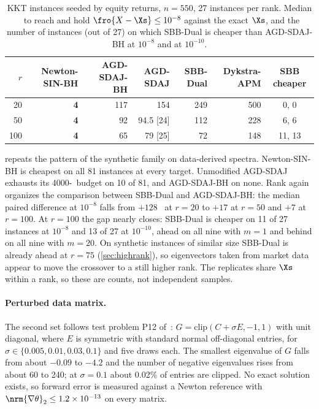 \begin{table}[t]
\centering
\caption{KKT instances seeded by equity returns, $n=550$, 27 instances per
rank. Median \EVDs\ to reach and hold $\fro{X-\Xs}\le10^{-8}$ against the exact
$\Xs$, and the number of instances (out of 27) on which SBB-Dual is cheaper
than AGD-SDAJ-BH at $10^{-8}$ and at $10^{-10}$.}
\label{tab:thesiskkt}
\small
\begin{tabular}{rrrrrrc}
\toprule
$r$ & Newton-SIN-BH & AGD-SDAJ-BH & AGD-SDAJ & SBB-Dual & Dykstra-APM & SBB cheaper\\
\midrule
20  & \textbf{4} & 117 & 154 & 249 & 500 & 0, 0\\
50  & \textbf{4} & 92  & 94.5 \tiny[24] & 112 & 228 & 6, 6\\
100 & \textbf{4} & 65  & 79 \tiny[25] & 72  & 148 & 11, 13\\
\bottomrule
\end{tabular}
\end{table}

 repeats the pattern of the synthetic family on
data-derived spectra. Newton-SIN-BH is cheapest on all 81 instances at every
target. Unmodified AGD-SDAJ exhausts its 4000-\EVD\ budget on 10 of 81, and
AGD-SDAJ-BH on none. Rank again organizes the comparison between SBB-Dual and
AGD-SDAJ-BH: the median paired difference at $10^{-8}$ falls from $+128$ \EVDs\
at $r=20$ to $+17$ at $r=50$ and $+7$ at $r=100$. At $r=100$ the gap nearly
closes: SBB-Dual is cheaper on 11 of 27 instances at $10^{-8}$ and 13 of 27 at
$10^{-10}$, ahead on all nine with $m=1$ and behind on all nine with $m=20$.
On synthetic instances of similar size SBB-Dual is already ahead at $r=75$
(\cref{sec:highrank}), so eigenvectors taken from market data appear to move
the crossover to a still higher rank. The replicates share $\Xs$ within a
rank, so these are counts, not independent samples.

\paragraph{Perturbed data matrix.}
The second set follows test problem P12 of~\cite{huynh2025accelerated}:
$G=\mathrm{clip}(C+\sigma E,-1,1)$ with unit diagonal, where $E$ is symmetric
with standard normal off-diagonal entries, for
$\sigma\in\{0.005,0.01,0.03,0.1\}$ and five draws each. The smallest
eigenvalue of $G$ falls from about $-0.09$ to $-4.2$ and the number of negative
eigenvalues rises from about 60 to 240; at $\sigma=0.1$ about 0.02\% of entries
are clipped. No exact solution exists, so forward error is measured against a
Newton reference with $\nrm{\nabla\theta}_2\le1.2\times10^{-13}$ on every
matrix.

